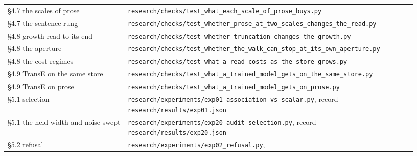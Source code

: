 \documentclass[10pt,letterpaper,twocolumn]{article}
\begin{document}
\begin{center}
{\begin{xtabular}{L{0.276\linewidth}L{0.655\linewidth}}
§4.7 the scales of prose & \texttt{research/\allowbreak{}checks/\allowbreak{}test\_\allowbreak{}what\_\allowbreak{}each\_\allowbreak{}scale\_\allowbreak{}of\_\allowbreak{}prose\_\allowbreak{}buys.\allowbreak{}py} \\
§4.7 the sentence rung & \texttt{research/\allowbreak{}checks/\allowbreak{}test\_\allowbreak{}whether\_\allowbreak{}prose\_\allowbreak{}at\_\allowbreak{}two\_\allowbreak{}scales\_\allowbreak{}changes\_\allowbreak{}the\_\allowbreak{}read.\allowbreak{}py} \\
§4.8 growth read to its end & \texttt{research/\allowbreak{}checks/\allowbreak{}test\_\allowbreak{}whether\_\allowbreak{}truncation\_\allowbreak{}changes\_\allowbreak{}the\_\allowbreak{}growth.\allowbreak{}py} \\
§4.8 the aperture & \texttt{research/\allowbreak{}checks/\allowbreak{}test\_\allowbreak{}whether\_\allowbreak{}the\_\allowbreak{}walk\_\allowbreak{}can\_\allowbreak{}stop\_\allowbreak{}at\_\allowbreak{}its\_\allowbreak{}own\_\allowbreak{}aperture.\allowbreak{}py} \\
§4.8 the cost regimes & \texttt{research/\allowbreak{}checks/\allowbreak{}test\_\allowbreak{}what\_\allowbreak{}a\_\allowbreak{}read\_\allowbreak{}costs\_\allowbreak{}as\_\allowbreak{}the\_\allowbreak{}store\_\allowbreak{}grows.\allowbreak{}py} \\
§4.9 TransE on the same store & \texttt{research/\allowbreak{}checks/\allowbreak{}test\_\allowbreak{}what\_\allowbreak{}a\_\allowbreak{}trained\_\allowbreak{}model\_\allowbreak{}gets\_\allowbreak{}on\_\allowbreak{}the\_\allowbreak{}same\_\allowbreak{}store.\allowbreak{}py} \\
§4.9 TransE on prose & \texttt{research/\allowbreak{}checks/\allowbreak{}test\_\allowbreak{}what\_\allowbreak{}a\_\allowbreak{}trained\_\allowbreak{}model\_\allowbreak{}gets\_\allowbreak{}on\_\allowbreak{}prose.\allowbreak{}py} \\
§5.1 selection & \texttt{research/\allowbreak{}experiments/\allowbreak{}exp01\_\allowbreak{}association\_\allowbreak{}vs\_\allowbreak{}scalar.\allowbreak{}py},
record
\texttt{research/\allowbreak{}results/\allowbreak{}exp01.\allowbreak{}json} \\
§5.1 the held width and noise swept & \texttt{research/\allowbreak{}experiments/\allowbreak{}exp20\_\allowbreak{}audit\_\allowbreak{}selection.\allowbreak{}py},
record
\texttt{research/\allowbreak{}results/\allowbreak{}exp20.\allowbreak{}json} \\
§5.2 refusal & \texttt{research/\allowbreak{}experiments/\allowbreak{}exp02\_\allowbreak{}refusal.\allowbreak{}py},

\end{xtabular}}
\end{center}
\end{document}
